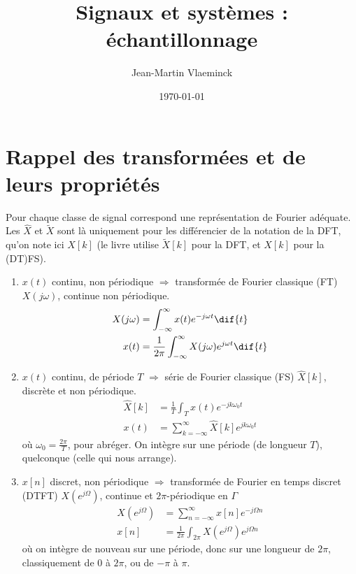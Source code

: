 \documentclass{article}
\title{Signaux et systèmes : échantillonnage}
\author{Jean-Martin Vlaeminck}
\date{\today}
\begin{document}
\maketitle
\section{Rappel des transformées et de leurs propriétés}

Pour chaque classe de signal correspond une représentation de Fourier adéquate. Les $\hat{X}$ et $\tilde{X}$ sont là uniquement pour les différencier de la notation de la DFT, qu'on note ici $X[k]$ (le livre utilise $\tilde{X}[k]$ pour la DFT, et $X[k]$ pour la (DT)FS).

\begin{enumerate}
	\item $x(t)$ continu, non périodique $\Rightarrow$ transformée de Fourier classique (FT) $X(j\omega)$, continue non périodique.
	\begin{align}
	X(j\omega) &= \int_{-\infty}^{\infty} x(t) e^{-j\omega t} \dif{t} \label{eq:ft_from_xt_def} \\
	x(t) &= \frac{1}{2\pi} \int_{-\infty}^{\infty} X(j\omega) e^{j\omega t} \dif{t} \label{eq:xt_from_ft_def}
	\end{align}

	\item $x(t)$ continu, de période $T$ $\Rightarrow$ série de Fourier classique (FS) $\hat{X}[k]$, discrète et non périodique.
	\begin{align}
	\hat{X}[k] &= \frac{1}{T} \int_{T} x(t) e^{-j k \omega_0 t} \label{eq:fs_from_xt_def} \\
	x(t) &= \sum_{k=-\infty}^{\infty} \hat{X}[k] e^{j k \omega_0 t} \label{eq:xt_from_fs_def}
	\end{align}
	où $\omega_0 = \frac{2\pi}{T}$, pour abréger. On intègre sur une période (de longueur $T$), quelconque (celle qui nous arrange).

	\item $x[n]$ discret, non périodique $\Rightarrow$ transformée de Fourier en temps discret (DTFT) $X\left(e^{j\Omega}\right)$, continue et $2\pi$-périodique en $\Gamma$
	\begin{align}
	X\left(e^{j\Omega}\right) &= \sum_{n=-\infty}^{\infty} x[n] e^{-j\Omega n} \label{eq:dtft_from_xn_def} \\
	x[n] &= \frac{1}{2\pi} \int_{2\pi} X\left(e^{j\Omega}\right) e^{j\Omega n} \label{eq:xn_from_dtft_def}
	\end{align}
	où on intègre de nouveau sur une période, donc sur une longueur de $2\pi$, classiquement de $0$ à $2\pi$, ou de $-\pi$ à $\pi$.


\end{enumerate}
\end{document}
